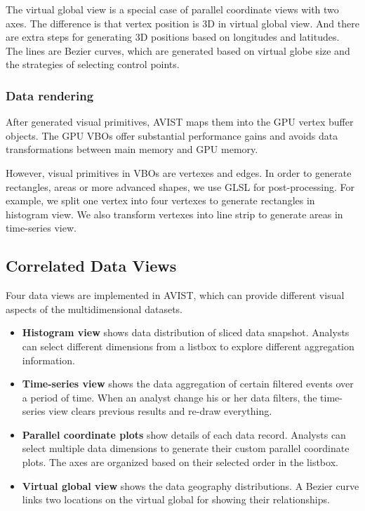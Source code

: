 The virtual global view is a special case of parallel coordinate views with two axes. The difference is that vertex position is 3D in virtual global view. And there are extra steps for generating 3D positions based on longitudes and latitudes. 
The lines are Bezier curves, which are generated based on virtual globe size and the strategies of selecting control points.


\subsubsection{Data rendering}
After generated visual primitives, AVIST maps them into the GPU vertex buffer objects. The  GPU VBOs offer substantial performance gains and avoids data transformations between main memory and GPU memory.

However,  visual primitives in VBOs are vertexes and edges. In order to  generate rectangles, areas or more advanced shapes, we use GLSL for post-processing. For example, we split one vertex into four vertexes to generate rectangles in histogram view. We also transform vertexes into line strip to generate areas in time-series view.


\subsection{Correlated Data Views}
Four data views are implemented in AVIST, which can provide different visual aspects of the multidimensional datasets.

\begin{itemize}
	
	
	\item \textbf{Histogram view} shows  data distribution of  sliced data snapshot. Analysts can select different dimensions  from a listbox to explore different aggregation information.
	
	\item \textbf{Time-series view} shows the data aggregation of certain filtered events over a period of time. When an analyst change his or her data filters, the time-series view clears previous results and re-draw everything. 
	
	\item \textbf{Parallel coordinate plots} show  details of each data record. Analysts can select multiple data dimensions to generate their custom parallel coordinate plots. The axes are organized based on their selected order in the listbox.
	
	\item \textbf{Virtual global view} shows the data geography distributions.  A Bezier curve links two locations on the virtual global for showing their  relationships.
	
\end{itemize}

